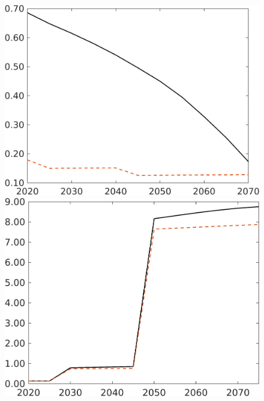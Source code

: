 \begin{figure}[h!!]
	\begin{minipage}[]{0.32\textwidth}
	\includegraphics[width=1\textwidth]{../../codding_model/own_basedOnFried/optimalPol_190722_tidiedUp/figures/all_July22/gAagg_CompEffOPT_T_NoTaus_regime3_opteff_spillover0_noskill0_sep1_xgrowth0_countec0_etaa0.79_lgd0_lff0.png}
\end{minipage}
\begin{minipage}[]{0.32\textwidth}
	\includegraphics[width=1\textwidth]{../../codding_model/own_basedOnFried/optimalPol_190722_tidiedUp/figures/all_July22/GFF_CompEffOPT_T_NoTaus_regime3_opteff_spillover0_noskill0_sep1_xgrowth0_countec0_etaa0.79_lgd0_lff0.png}

\end{minipage}
\end{figure}
